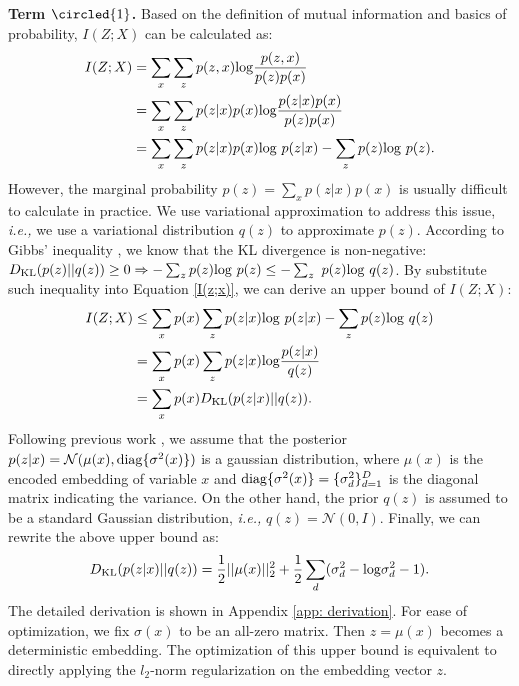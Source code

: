 \noindent \textbf{Term $\circled{1}$.} Based on the definition of mutual information and basics of probability, $I(Z; X)$ can be calculated as:
\begin{equation}
\begin{aligned}
    I(Z; X)&=\sum_x \sum_z p(z,x) {\rm log} \frac{p(z,x)}{p(z)p(x)} \\
    &=\sum_x \sum_z p(z|x)p(x) {\rm log} \frac{p(z|x)p(x)}{p(z)p(x)}\\
    &=\sum_x \sum_z p(z|x)p(x){\rm log}~ p(z|x)-\sum_z p(z){\rm log}~p(z).
    \label{I(z;x)}
\end{aligned}
\end{equation}
However, the marginal probability $p(z) = \sum_x p(z|x)p(x)$ is usually difficult to calculate in practice. We use variational approximation to address this issue, \emph{i.e.,} we use a variational distribution $q(z)$ to approximate $p(z)$. According to Gibbs’ inequality \cite{mackay2003information}, we know that the KL divergence is non-negative: $D_{\rm KL}(p(z)||q(z))\ge 0 \Rightarrow -\sum_z p(z) {\rm log}~p(z)\le -\sum_z~p(z) {\rm log}~q(z)$. By substitute such inequality into Equation \ref{I(z;x)}, we can derive an upper bound of $I(Z;X)$:
\begin{equation}
\begin{aligned}
    I(Z; X)&\le\sum_x p(x)\sum_z p(z|x){\rm log}~ p(z|x)-\sum_z p(z){\rm log}~q(z)\\
    &=\sum_x p(x)\sum_z p(z|x) {\rm log} \frac{p(z|x)}{q(z)}\\
    &=\sum_x p(x)D_{\rm KL}(p(z|x)||q(z)).
    \label{upper bound}
\end{aligned}
\end{equation}
Following previous work \cite{alemi2016deep}, we assume that the posterior $p(z|x)=\mathcal{N}(\mu(x),{\rm diag}\{\sigma^2(x)\})$ is a gaussian distribution, where $\mu(x)$ is the encoded embedding of variable $x$ and ${\rm diag} \{\sigma^2(x)\} = \{\sigma_d^2\}_{d=1}^D$ is the diagonal matrix indicating the variance. On the other hand, the prior $q (z)$ is assumed to be a standard Gaussian distribution, \emph{i.e.,} $q(z) = \mathcal{N}(0, I)$. Finally, we can rewrite the above upper bound as:
\begin{equation}
D_{\rm KL}(p(z|x)||q(z))=\frac{1}{2}||\mu(x)||_2^2+\frac{1}{2}\sum_d(\sigma_d^2- {\rm log}\sigma_d^2 -1).
\label{kl gaussian}
\end{equation}
The detailed derivation is shown in Appendix \ref{app: derivation}.
For ease of optimization, we fix $\sigma(x)$ to be an all-zero matrix.  
Then $z = \mu(x)$ becomes a deterministic embedding. The optimization of this upper bound is equivalent to directly applying the $l_2$-norm regularization on the embedding vector $z$.

